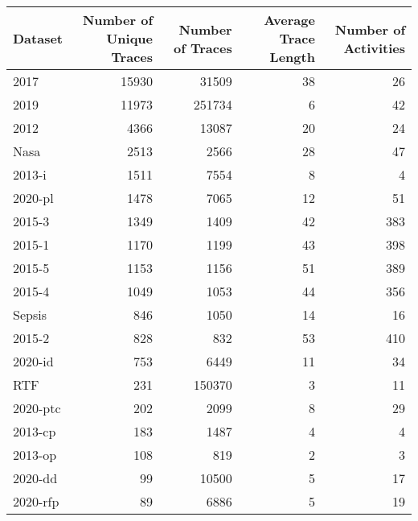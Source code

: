 \begin{tabular}{lrrrr}
\toprule
Dataset & Number of Unique Traces & Number of Traces & Average Trace Length & Number of Activities \\
\midrule
2017 & 15930 & 31509 & 38 & 26 \\
2019 & 11973 & 251734 & 6 & 42 \\
2012 & 4366 & 13087 & 20 & 24 \\
Nasa & 2513 & 2566 & 28 & 47 \\
2013-i & 1511 & 7554 & 8 & 4 \\
2020-pl & 1478 & 7065 & 12 & 51 \\
2015-3 & 1349 & 1409 & 42 & 383 \\
2015-1 & 1170 & 1199 & 43 & 398 \\
2015-5 & 1153 & 1156 & 51 & 389 \\
2015-4 & 1049 & 1053 & 44 & 356 \\
Sepsis & 846 & 1050 & 14 & 16 \\
2015-2 & 828 & 832 & 53 & 410 \\
2020-id & 753 & 6449 & 11 & 34 \\
RTF & 231 & 150370 & 3 & 11 \\
2020-ptc & 202 & 2099 & 8 & 29 \\
2013-cp & 183 & 1487 & 4 & 4 \\
2013-op & 108 & 819 & 2 & 3 \\
2020-dd & 99 & 10500 & 5 & 17 \\
2020-rfp & 89 & 6886 & 5 & 19 \\
\bottomrule
\end{tabular}
